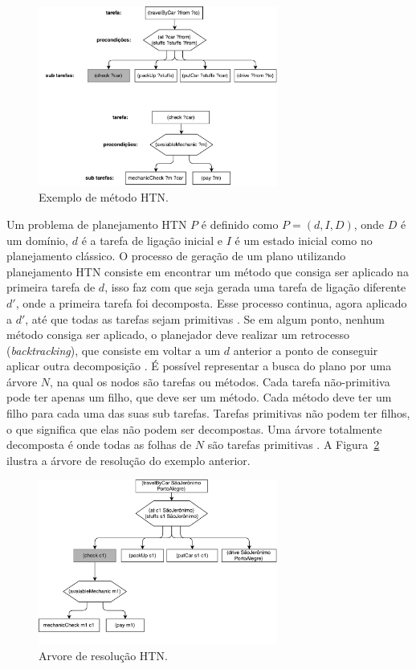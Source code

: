 \begin{figure}[ht]
	\centering
	\includegraphics[width=0.7\textwidth]{fig/htnmethod.pdf}
	\caption{Exemplo de método HTN.}
	\label{fig:htnmethod}
\end{figure} 

Um problema de planejamento HTN $P$ é definido como $P = (d, I, D)$, onde $D$ é um domínio, $d$ é a tarefa de ligação inicial e $I$ é um estado inicial como no planejamento clássico. 
O processo de geração de um plano utilizando planejamento HTN consiste em encontrar um método que consiga ser aplicado na primeira tarefa de $d$, isso faz com que seja gerada uma tarefa de ligação diferente $d'$, onde a primeira tarefa foi decomposta. 
Esse processo continua, agora aplicado a $d'$, até que todas as tarefas sejam primitivas \cite{meneguzzi2015planning}. 
Se em algum ponto, nenhum método consiga ser aplicado, o planejador deve realizar um retrocesso (\textit{backtracking}), que consiste em voltar a um $d$ anterior a ponto de conseguir aplicar outra decomposição \cite[Capítulo 11]{intelligence2003modern}. 
É possível representar a busca do plano por uma árvore $N$, na qual os nodos são tarefas ou métodos. 
Cada tarefa não-primitiva pode ter apenas um filho, que deve ser um método. 
Cada método deve ter um filho para cada uma das suas sub tarefas. 
Tarefas primitivas não podem ter filhos, o que significa que elas não podem ser decompostas. 
Uma árvore totalmente decomposta é onde todas as folhas de $N$ são tarefas primitivas \cite{ontanon2015adversarial}. 
A Figura~\ref{fig:htnmethodtree} ilustra a árvore de resolução do exemplo anterior.

\begin{figure}[ht]
	\centering
	\includegraphics[width=0.7\textwidth]{fig/htnmethodresult.pdf}
	\caption{Arvore de resolução HTN.}
	\label{fig:htnmethodtree}
\end{figure}

